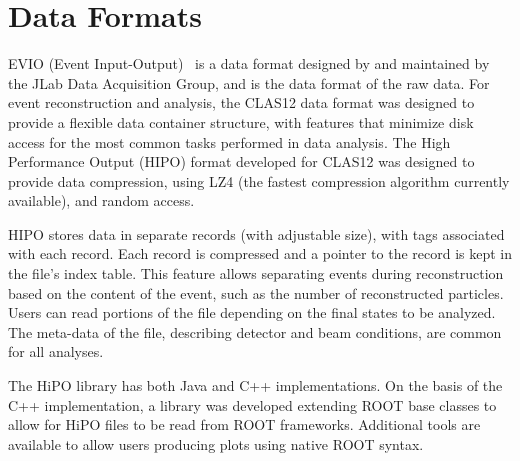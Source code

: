 \section{Data Formats}
\label{sec-formats}

EVIO (Event Input-Output)~\cite{evio} is a data format designed by and maintained by the JLab Data
Acquisition Group, and is the data format of the raw data. For event reconstruction and analysis, the CLAS12
data format was designed to provide a flexible data container structure, with features that minimize disk access
for the most common tasks performed in data analysis. The High Performance Output (HIPO) format developed for
CLAS12 was designed to provide data compression, using LZ4 (the fastest compression algorithm currently available),
and random access.

HIPO stores data in separate records (with adjustable size), with tags associated with each record. Each record
is compressed and a pointer to the record is kept in the file's index table. This feature allows separating events
during reconstruction based on the content of the event, such as the number of reconstructed particles. Users can
read portions of the file depending on the final states to be analyzed.  The meta-data of the file, describing detector
and beam conditions, are common for all analyses.

The HiPO library has both Java and C++ implementations. On the basis of the C++
implementation, a library was developed extending ROOT base classes
to allow for HiPO files to be read from ROOT frameworks. Additional tools
are available to allow users producing plots using native ROOT syntax.
